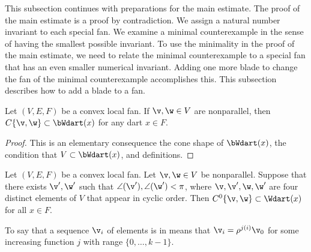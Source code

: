 This subsection continues with preparations for the main estimate.
The proof of the main estimate is a proof by contradiction.  We assign
a natural number invariant to each special fan.  We examine a minimal
counterexample in the sense of having the smallest possible invariant.
To use the minimality in the proof of the main estimate, we need to
relate the minimal counterexample to a special fan that has an even
smaller numerical invariant.  Adding one more blade to change the
fan of the minimal counterexample accomplishes this.  This subsection
describes how to add a blade to a fan.



\begin{lemma}[] Let $(V,E,F)$ be a convex local fan.
If $\v,\w\in V$ are nonparallel, then $C\{\v,\w\} \subset
\bWdart(x)$ for any dart $x\in F$.
\end{lemma}
%

\begin{proof} This is an elementary consequence 
the cone shape of $\bWdart(x)$,  the condition that $V\subset
\bWdart(x)$, and definitions.
\end{proof}


\begin{lemma} \label{lemma:internal}
Let $(V,E,F)$ be a convex local fan.  Let $\v,\w\in V$ be nonparallel.
Suppose that there exists $\v',\w'$ such that
$\angle(\v'),\angle(\w')<\pi$, where $\v,\v',\w,\w'$ are four
distinct elements of $V$ that appear in cyclic order.  Then
$C^0\{\v,\w\}\subset \Wdart(x)$ for all $x\in F$.
\end{lemma}
%
%

To say that a sequence $\v_i$ of elements is in  means that $\v_i = \rho^{j (i)}\v_0$ for some increasing
function $j$ with range $\{0,\ldots,k-1\}$.

